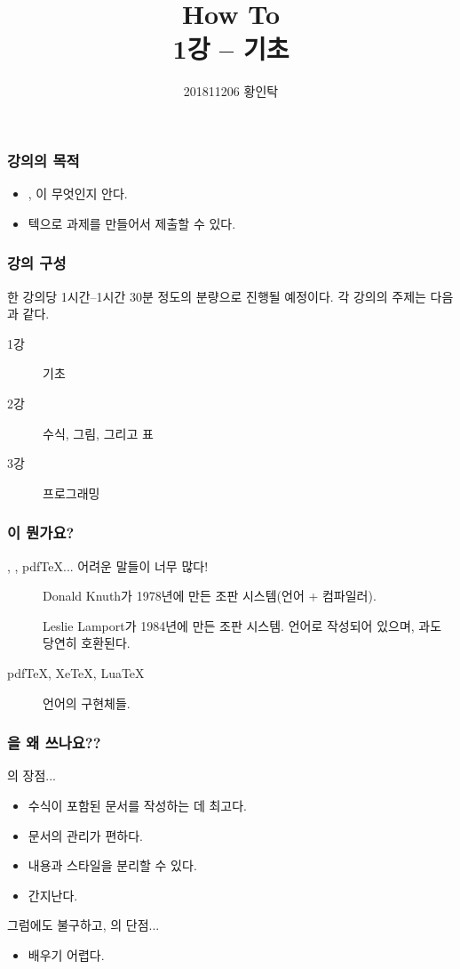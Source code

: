 \documentclass[aspectratio={169}]{beamer}
\title{How To \latex{} \\ \normalsize \textnormal{1강 -- \latex{} 기초}}
\author{201811206 황인탁}
\begin{document}
\maketitle

\begin{frame}
    \frametitle{강의의 목적}

    \begin{itemize}
        \item \tex{}, \latex{}이 무엇인지 안다.
        \item 텍으로 과제를 만들어서 제출할 수 있다.
    \end{itemize}

\end{frame}

\begin{frame}
    \frametitle{강의 구성}

    한 강의당 1시간--1시간 30분 정도의 분량으로 진행될 예정이다. 각 강의의 주제는 다음과 같다.

    \begin{description}
        \item[1강] \latex{} 기초
        \item[2강] 수식, 그림, 그리고 표
        \item[3강] \latex{} 프로그래밍
    \end{description}

\end{frame}

\begin{frame}
    \frametitle{\tex{}이 뭔가요?}

    \tex{}, \latex{}, pdfTeX... 어려운 말들이 너무 많다!

    \begin{description}
        \item[\tex{}] Donald Knuth가 1978년에 만든 조판 시스템(언어 + 컴파일러).
        \item[\latex{}] Leslie Lamport가 1984년에 만든 조판 시스템. \tex{} 언어로 작성되어 있으며, \tex{}과도 당연히 호환된다.
        \item[pdfTeX, XeTeX, LuaTeX] \tex{} 언어의 구현체들.
    \end{description}

\end{frame}

\begin{frame}
    \frametitle{\tex{}을 왜 쓰나요??}

    \tex{}의 장점...
    \begin{itemize}
        \item 수식이 포함된 문서를 작성하는 데 최고다.
        \item 문서의 관리가 편하다.
        \item 내용과 스타일을 분리할 수 있다.
        \item 간지난다.
    \end{itemize}

    그럼에도 불구하고, \tex{}의 단점...
    \begin{itemize}
        \item 배우기 어렵다.
    \end{itemize}
\end{frame}
\end{document}
